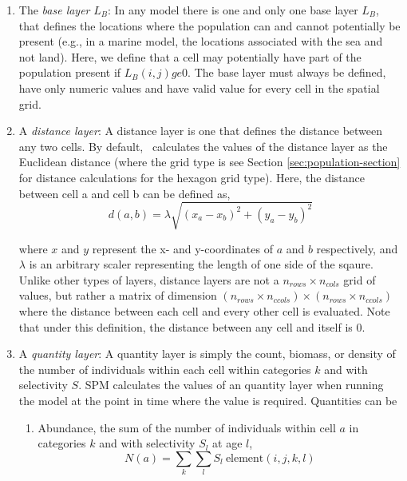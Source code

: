 \begin{enumerate}

\item The \emph{base layer} $L_B$: In any model there is one and only one base layer $L_B$, that defines the locations where the population can and cannot potentially be present (e.g., in a marine model, the locations associated with the sea and not land). Here, we define that a cell may potentially have part of the population present if $L_B(i,j) ge 0$. The base layer must always be defined, have only numeric values and have valid value for every cell in the spatial grid.

\item A \emph{distance layer}: A distance layer is one that defines the distance between any two cells. By default, \SPM\ calculates the values of the distance layer as the Euclidean distance (where the grid type is  \textemdash see Section \ref{sec:population-section} for distance calculations for the hexagon grid type). Here, the distance between cell a and cell b can be defined as,
\begin{equation}
  d(a,b) = \lambda \sqrt{(x_a - x_b)^2 + (y_a - y_b)^2}
\end{equation}

where $x$ and $y$ represent the x- and y-coordinates of $a$ and $b$ respectively, and $\lambda$ is an arbitrary scaler representing the length of one side of the sqaure. Unlike other types of layers, distance layers are not a $n_{rows} \times n_{cols}$ grid of values, but rather a matrix of dimension $(n_{rows} \times n_{ccols}) \times (n_{rows} \times n_{ccols})$  where the distance between each cell and every other cell is evaluated. Note that under this definition, the distance between any cell and itself is 0. 

\item A \emph{quantity layer}: A quantity layer is simply the count, biomass, or density of the number of individuals within each cell within categories $k$ and with selectivity $S$. SPM calculates the values of an quantity layer when running the model at the point in time where the value is required. Quantities can be 

\begin{enumerate}
\item Abundance, the sum of the number of individuals within cell $a$ in categories $k$ and with selectivity $S_l$ at age $l$,
\begin{equation}
  N(a) = \sum\limits_{k} \sum\limits_l S_l \ \text{element}(i,j,k,l)
\end{equation}


\end{enumerate}
\end{enumerate}
